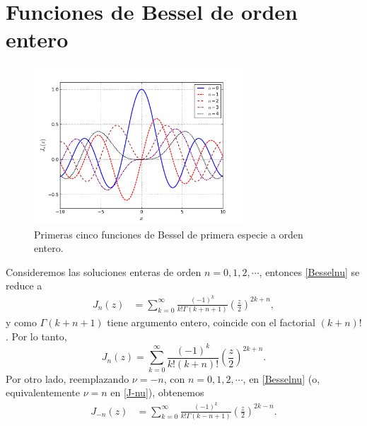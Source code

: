 \section{Funciones de Bessel de orden entero}
\begin{figure}[H]
\centering
\includegraphics[angle=0,width=0.7\textwidth]{figs/fig-Bessel-J.pdf}
\caption{Primeras cinco funciones de Bessel de primera especie a orden entero.}
\label{fig-Jn}
\end{figure}
Consideremos las soluciones enteras de orden $n=0,1,2,\cdots$, entonces \eqref{Besselnu} se reduce a
\begin{align}
J_n(z) &= \sum_{k=0}^\infty \frac{(-1)^k}{k!\Gamma(k+n+ 1)}
\left(\frac{z}{2}\right)^{2k+n},
\end{align}
y como $\Gamma(k+n+ 1)$ tiene argumento entero, coincide con el factorial $(k+n)!$. Por lo tanto,
\begin{equation}
\boxed{J_n(z) =\sum_{k=0}^\infty \frac{(-1)^k}{k!(k+n)!}
\left(\frac{z}{2}\right)^{2k+n}.}
\end{equation}
Por otro lado, reemplazando $\nu=-n$, con $n=0,1,2,\cdots$, en \eqref{Besselnu} (o, equivalentemente $\nu=n$ en \eqref{J-nu}), obtenemos
\begin{align}\label{J-n}
J_{-n}(z) &= \sum_{k=0}^\infty \frac{(-1)^k}{k!\Gamma(k-n+ 1) }
\left(\frac{z}{2}\right)^{2k-n}.
\end{align}

